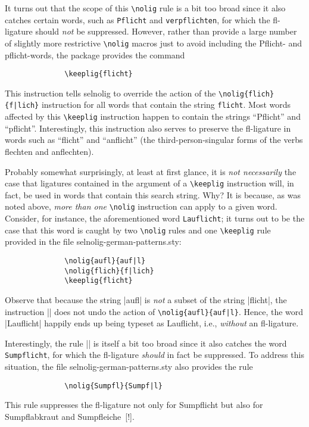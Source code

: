 \documentclass[11pt]{article}
\newcommand{\pkg}[1]{\textsf{#1}}
\newcommand{\opt}[1]{\texttt{#1}}
\newcommand{\cmmd}[1]{\texttt{\textbackslash #1}}
\begin{document}
It turns out that the scope of this \cmmd{nolig} rule is a bit too broad since it also catches certain words, such as \opt{Pflicht} and \opt{verpflichten}, for which the fl-ligature should \emph{not} be suppressed. However, rather than provide a large number of slightly more restrictive \cmmd{nolig} macros just to avoid including the Pflicht- and pflicht-words, the package provides the command
\begin{Verbatim}
              \keeplig{flicht}
\end{Verbatim}
This instruction tells \pkg{selnolig} to override the action of the \Verb+\nolig{flich}{f|lich}+ instruction for all words that contain the string \opt{flicht}. Most words affected by this \cmmd{keeplig} instruction happen to contain the strings \enquote{Pflicht} and \enquote{pflicht}. Interestingly, this instruction also serves to preserve the fl-ligature in words such as \enquote{flicht} and \enquote{anflicht} (the third-person-singular forms of the verbs flechten and anflechten). 

Probably somewhat surprisingly, at least at first glance, it is \emph{not necessarily} the case that ligatures contained in the argument of a \cmmd{keeplig} instruction will, in fact, be used in words that contain this search string. Why? It is because, as was noted above, \emph{more than one} \cmmd{nolig} instruction can apply to a given word. Consider, for instance, the aforementioned word \opt{Lauflicht}; it turns out to be the case that this word is caught by two \cmmd{nolig} rules and one \cmmd{keeplig} rule provided in the file \pkg{selnolig-german-patterns.sty}:
\begin{Verbatim}
              \nolig{aufl}{auf|l}
              \nolig{flich}{f|lich}
              \keeplig{flicht}
\end{Verbatim}
Observe that because the string |aufl| is \emph{not} a subset of the string |flicht|, the instruction || does not undo the action of \Verb+\nolig{aufl}{auf|l}+. Hence, the word |Lauflicht| happily ends up being typeset as Lauflicht, i.e., \emph{without} an fl-ligature. 

Interestingly, the rule  || is itself a bit too broad since it also catches the word \opt{Sumpf\-licht}, for which the fl-ligature \emph{should} in fact be suppressed. To address this situation, the file \pkg{selnolig-german-patterns.sty} also provides the rule 
\begin{Verbatim}
              \nolig{Sumpfl}{Sumpf|l}
\end{Verbatim}
This rule suppresses the fl-ligature not only for Sumpflicht but also for Sumpflabkraut and Sumpfleiche~[!].
\end{document}
